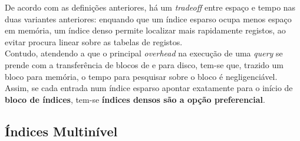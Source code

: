 \documentclass[oneside]{book}
\theoremstyle{definition}
\begin{document}
De acordo com as definições anteriores, há um \textit{tradeoff} entre espaço e tempo nas duas variantes anteriores: enquando que um índice esparso ocupa menos espaço em memória, um índice denso permite localizar mais rapidamente registos, ao evitar procura linear sobre as tabelas de registos.\\
Contudo, atendendo a que o principal \textit{overhead} na execução de uma \textit{query} se prende com a transferência de blocos de e para disco, tem-se que, trazido um bloco para memória, o tempo para pesquisar sobre o bloco é negligenciável. Assim, se cada entrada num índice esparso apontar exatamente para o início de \textbf{bloco de índices}, tem-se \textbf{índices densos são a opção preferencial}.

\subsection{Índices Multinível}
\end{document}
